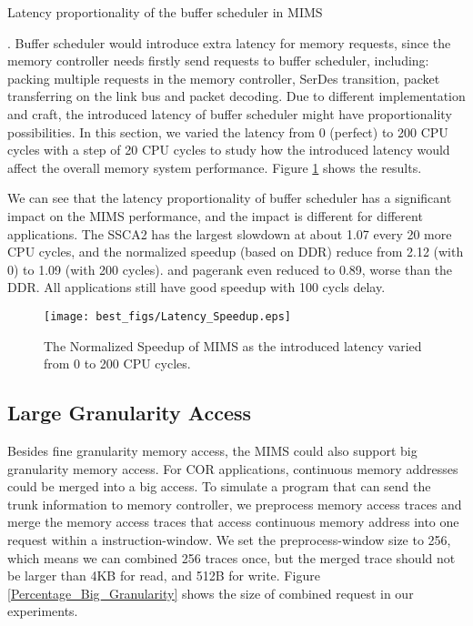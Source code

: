 \documentclass[pageno]{jpaper}
\begin{document}
\begin{bfseries}Latency proportionality of the buffer scheduler in MIMS\end{bfseries}. Buffer scheduler would introduce extra latency for memory requests, since the memory controller needs firstly send requests to buffer scheduler, including: packing multiple requests in the memory controller, SerDes transition, packet transferring on the link bus and packet decoding. Due to different implementation and craft, the introduced latency of buffer scheduler might have proportionality possibilities. In this section, we varied the latency from 0 (perfect) to 200 CPU cycles with a step of 20 CPU cycles to study how the introduced latency would affect the overall memory system performance. Figure \ref{Latency_Speedup} shows the results.

We can see that the latency proportionality of buffer scheduler has a significant impact on the MIMS performance, and the impact is different for different applications. The SSCA2 has the largest slowdown at about 1.07 every 20 more CPU cycles, and the normalized speedup (based on DDR) reduce from 2.12 (with 0) to 1.09 (with 200 cycles). and pagerank even reduced to 0.89, worse than the DDR. All applications still have good speedup with 100 cycls delay.

\begin{figure}
  \centering
  \texttt{[image: best\_figs/Latency\_Speedup.eps]}
  \caption{The Normalized Speedup of MIMS as the introduced latency varied from 0 to 200 CPU cycles.}
  \label{Latency_Speedup}
\end{figure}

\subsection {Large Granularity Access}


Besides fine granularity memory access, the MIMS could also support big granularity memory access. For COR applications, continuous memory addresses could be merged into a big access. To simulate a program that can send the trunk information to memory controller, we preprocess memory access traces and merge the memory access traces that access continuous memory address into one request within a instruction-window. We set the preprocess-window size to 256, which means we can combined 256 traces once, but the merged trace should not be larger than 4KB for read, and 512B for write. Figure \ref{Percentage_Big_Granularity} shows the size of combined request in our experiments.
\end{document}
